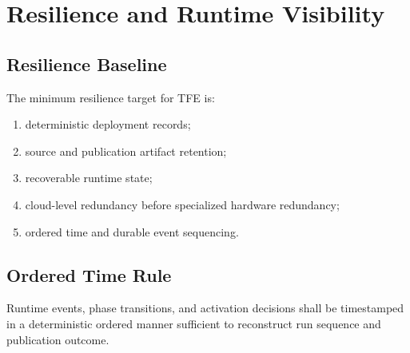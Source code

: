 \chapter{Resilience and Runtime Visibility}
\section{Resilience Baseline}
The minimum resilience target for TFE is:
\begin{enumerate}[leftmargin=1.2cm]
    \item deterministic deployment records;
    \item source and publication artifact retention;
    \item recoverable runtime state;
    \item cloud-level redundancy before specialized hardware redundancy;
    \item ordered time and durable event sequencing.
\end{enumerate}

\section{Ordered Time Rule}
Runtime events, phase transitions, and activation decisions shall be timestamped in a deterministic ordered manner sufficient to reconstruct run sequence and publication outcome.
